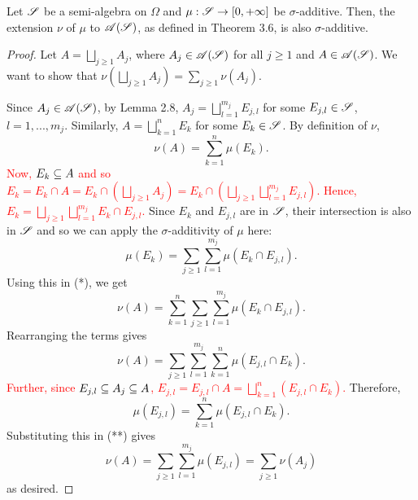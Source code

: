 \begin{theorem}
  Let $\mathscr{S}$ be a semi-algebra on $\Omega$ and $\mu : \mathscr{S} \to [0, +\infty]$ be $\sigma$-additive. Then, the extension $\nu$ of $\mu$ to $\mathscr{A}(\mathscr{S})$, as defined in Theorem 3.6, is also $\sigma$-additive.
\end{theorem}

\begin{proof}
  Let $A = \bigsqcup_{j \geq 1} A_j$, where $A_j \in \mathscr{A}(\mathscr{S})$ for all $j \geq 1$ and $A \in \mathscr{A}(\mathscr{S})$. We want to show that $\nu(\bigsqcup_{j \geq 1} A_j) = \sum_{j \geq 1} \nu(A_j)$.

  Since $A_j \in \mathscr{A}(\mathscr{S})$, by Lemma 2.8, $A_j = \bigsqcup_{l = 1}^{m_j} E_{j, l}$ for some $E_{j, l} \in \mathscr{S}$, $l = 1,..., m_j$. Similarly, $A = \bigsqcup_{k = 1}^n E_k$ for some $E_k \in \mathscr{S}$. By definition of $\nu$, 
  \[ \nu(A) = \sum_{k = 1}^n \mu(E_k). \tag{*} \]
  \textcolor{red}{Now, $E_k \subseteq A$ and so $E_k = E_k \cap A = E_k \cap \left( \bigsqcup_{j \geq 1} A_j \right) = E_k \cap \left( \bigsqcup_{j \geq 1} \bigsqcup_{l = 1}^{m_j} E_{j, l} \right)$. Hence, $E_k = \bigsqcup_{j \geq 1} \bigsqcup_{l = 1}^{m_j} E_k \cap E_{j, l} $.} Since $E_k$ and $E_{j, l}$ are in $\mathscr{S}$, their intersection is also in $\mathscr{S}$ and so we can apply the $\sigma$-additivity of $\mu$ here:
  \[ \mu(E_k) = \sum_{j \geq 1} \sum_{l = 1}^{m_j} \mu(E_k \cap E_{j, l}). \]
  Using this in (*), we get
  \[ \nu(A) = \sum_{k = 1}^n \sum_{j \geq 1} \sum_{l = 1}^{m_j} \mu(E_k \cap E_{j, l}).\]
  Rearranging the terms gives
  \[ \nu(A) = \sum_{j \geq 1} \sum_{l = 1}^{m_j} \sum_{k = 1}^{n} \mu(E_{j, l} \cap E_k). \tag{**}\]
  \textcolor{red}{Further, since $E_{j, l} \subseteq A_j \subseteq A$, $E_{j, l} = E_{j, l} \cap A = \bigsqcup_{k = 1}^n (E_{j, l} \cap E_k)$.} Therefore,
  \[ \mu(E_{j, l}) = \sum_{k = 1}^n \mu(E_{j, l} \cap E_k). \]
  Substituting this in (**) gives
  \[ \nu(A) = \sum_{j \geq 1} \sum_{l = 1}^{m_j} \mu(E_{j, l}) = \sum_{j \geq 1} \nu(A_j)\]
  as desired.
\end{proof}